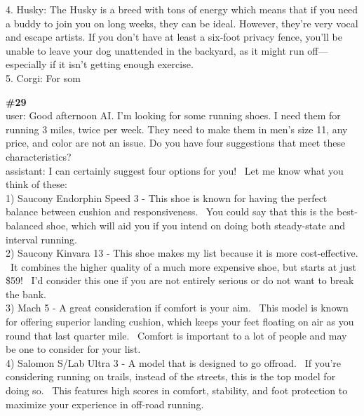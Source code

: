 \documentclass[10pt]{article}
\begin{document}
\begin{Form}
\begin{tcolorbox}[colback=convbg,colframe=itemframe,boxrule=0.8pt,arc=2pt,breakable,left=6pt,right=6pt,top=5pt,bottom=5pt]
{4. Husky: The Husky is a breed with tons of energy which means that if you need a buddy to join you on long weeks, they can be ideal. However, they're very vocal and escape artists. If you don't have at least a six-foot privacy fence, you'll be unable to leave your dog unattended in the backyard, as it might run off—especially if it isn't getting enough exercise. \\[2pt]
5. Corgi: For som}
\end{tcolorbox}
\vspace{-1pt}
\CheckBox[name=q28c,width=1.6ex,height=1.6ex,bordercolor={0.45 0.45 0.45}]{~\textcolor{cbox}{COMPACT}}\quad
\CheckBox[name=q28d,width=1.6ex,height=1.6ex,bordercolor={0.45 0.45 0.45}]{~\textcolor{dbox}{DIFFUSE}}\quad
\CheckBox[name=q28n,width=1.6ex,height=1.6ex,bordercolor={0.45 0.45 0.45}]{~\textcolor{nbox}{NONE}}
\vspace{8pt}
\begin{tcolorbox}[colback=convbg,colframe=itemframe,boxrule=0.8pt,arc=2pt,breakable,left=6pt,right=6pt,top=5pt,bottom=5pt]
{\footnotesize\textbf{\#29}}\\[3pt]
{\footnotesize user: Good afternoon AI.  I'm looking for some running shoes.  I need them for running 3 miles, twice per week.  They need to make them in men's size 11, any price, and color are not an issue.  Do you have four suggestions that meet these characteristics? \\[2pt]
assistant: I can certainly suggest four options for you!  Let me know what you think of these: \\[2pt]
1) Saucony Endorphin Speed 3 - This shoe is known for having the perfect balance between cushion and responsiveness.  You could say that this is the best-balanced shoe, which will aid you if you intend on doing both steady-state and interval running. \\[2pt]
2) Saucony Kinvara 13 - This shoe makes my list because it is more cost-effective.  It combines the higher quality of a much more expensive shoe, but starts at just \$59!  I'd consider this one if you are not entirely serious or do not want to break the bank. \\[2pt]
3) Mach 5 - A great consideration if comfort is your aim.  This model is known for offering superior landing cushion, which keeps your feet floating on air as you round that last quarter mile.  Comfort is important to a lot of people and may be one to consider for your list. \\[2pt]
4) Salomon S/Lab Ultra 3 - A model that is designed to go offroad.  If you're considering running on trails, instead of the streets, this is the top model for doing so.  This features high scores in comfort, stability, and foot protection to maximize your experience in off-road running.}

\end{tcolorbox}
\end{Form}
\end{document}
